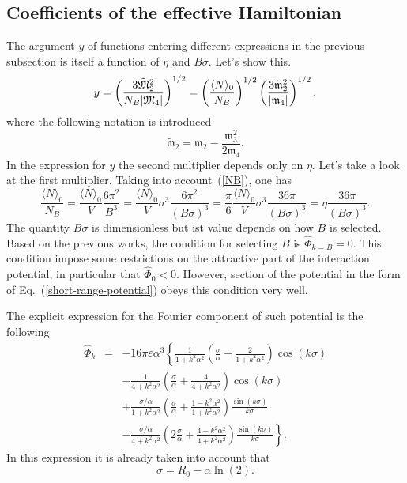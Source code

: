 \subsection{Coefficients of the effective Hamiltonian}
The argument $y$ of functions entering different expressions in the previous subsection is itself a function of $\eta$ and $B\sigma$. Let's show this.
\begin{equation}
	y=\left(\frac{3\tilde{\mathfrak{M}}_2^2}{N_B \abs{\mathfrak{M}_4}}\right)^{1/2} = \left(\frac{\langle N \rangle_0}{N_B}\right)^{1/2} \left(\frac{3\tilde{\mathfrak{m}}_2^2}{\abs{\mathfrak{m}_4}}\right)^{1/2},
\end{equation}
where the following notation is introduced
\begin{equation}
	\tilde{\mathfrak{m}}_2 = \mathfrak{m}_2 - \frac{\mathfrak{m}_3^2}{2\mathfrak{m}_4}.
\end{equation}
In the expression for $y$ the second multiplier depends only on $\eta$. Let's take a look at the first multiplier. Taking into account~(\ref{NB}), one has
\begin{equation}
	\frac{\langle N \rangle_0}{N_B} = \frac{\langle N \rangle_0}{V} \frac{6\pi^2}{B^3} = \frac{\langle N \rangle_0}{V}\sigma^3 \frac{6\pi^2}{(B\sigma)^3} = \frac{\pi}{6}\frac{\langle N \rangle_0}{V}\sigma^3 \frac{36\pi}{(B\sigma)^3} = \eta \frac{36\pi}{(B\sigma)^3}.
\end{equation}
The quantity $B\sigma$ is dimensionless but ist value depends on how $B$ is selected. Based on the previous works, the condition for selecting $B$ is $\hat{\Phi}_{k=B} = 0.$ This condition impose some restrictions on the attractive part of the interaction potential, in particular that $\hat{\Phi}_0 < 0.$ However, section of the potential in the form of Eq.~(\ref{short-range-potential}) obeys this condition very well. 

The explicit expression for the Fourier component of such potential is the following
\begin{eqnarray}
	\label{eq:part_morse_fourier}
	\hat{\Phi}_k &=& -16\pi \varepsilon \alpha^3 
	\left\{
	\frac{1}{1+k^2\alpha^2}\left(\frac{\sigma}{\alpha} + \frac{2}{1+k^2\alpha^2}\right) \cos(k\sigma)
	\right.
	\nonumber\\
	&& \left.
	-\frac{1}{4 + k^2\alpha^2} \left(\frac{\sigma}{\alpha} + \frac{4}{4 + k^2\alpha^2}\right) \cos(k\sigma)
	\right.
	\nonumber \\
	&& \left.
	+ \frac{\sigma/\alpha}{1 + k^2\alpha^2} \left(\frac{\sigma}{\alpha} + \frac{1 - k^2\alpha^2}{1 + k^2 \alpha^2}\right) \frac{\sin(k\sigma)}{k\sigma}
	\right.
	\nonumber\\
	&& \left.
	- \frac{\sigma/\alpha}{4 + k^2\alpha^2} \left(2\frac{\sigma}{\alpha} + \frac{4 - k^2\alpha^2}{4 + k^2\alpha^2}\right) \frac{\sin(k\sigma)}{k\sigma}
	\right\}.
\end{eqnarray}
In this expression it is already taken into account that
\begin{equation}
	\sigma = R_0 - \alpha\ln(2).
\end{equation}

